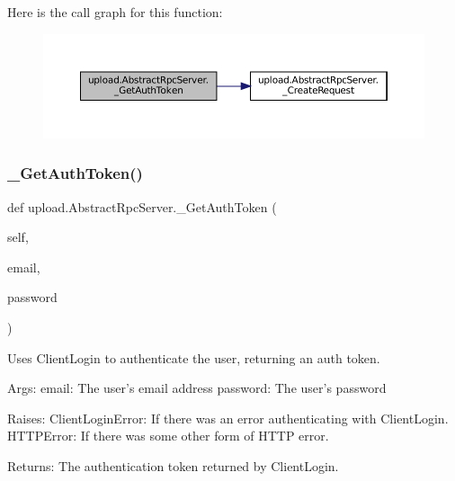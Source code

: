 Here is the call graph for this function\+:
\nopagebreak
\begin{figure}[H]
\begin{center}
\leavevmode
\includegraphics[width=350pt]{classupload_1_1AbstractRpcServer_a5a801cc3fdbb8222fa58d41e098f70a7_cgraph}
\end{center}
\end{figure}
\mbox{\label{classupload_1_1AbstractRpcServer_a5a801cc3fdbb8222fa58d41e098f70a7}} 
\subsubsection{\texorpdfstring{\+\_\+\+Get\+Auth\+Token()}{\_GetAuthToken()}\hspace{0.1cm}{\footnotesize\ttfamily [2/2]}}
{\footnotesize\ttfamily def upload.\+Abstract\+Rpc\+Server.\+\_\+\+Get\+Auth\+Token (\begin{DoxyParamCaption}\item[{}]{self,  }\item[{}]{email,  }\item[{}]{password }\end{DoxyParamCaption})\hspace{0.3cm}{\ttfamily [private]}}

\begin{DoxyVerb}Uses ClientLogin to authenticate the user, returning an auth token.

Args:
  email:    The user's email address
  password: The user's password

Raises:
  ClientLoginError: If there was an error authenticating with ClientLogin.
  HTTPError: If there was some other form of HTTP error.

Returns:
  The authentication token returned by ClientLogin.
\end{DoxyVerb}
 

